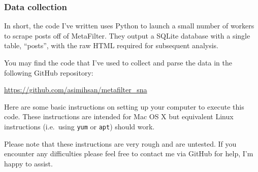 \subsubsection{Data collection}

In short, the code I've written uses Python to launch a small number of
workers to scrape posts off of MetaFilter. They output a SQLite database
with a single table, ``posts'', with the raw HTML required for
subsequent analysis.

You may find the code that I've used to collect and parse the data in
the following GitHub repository:

\url{https://github.com/asimihsan/metafilter_sna}

Here are some basic instructions on setting up your computer to execute
this code. These instructions are intended for Mac OS X but equivalent
Linux instructions (i.e.~using \texttt{yum} or \texttt{apt}) should
work.

Please note that these instructions are very rough and are untested. If
you encounter any difficulties please feel free to contact me via GitHub
for help, I'm happy to assist.

